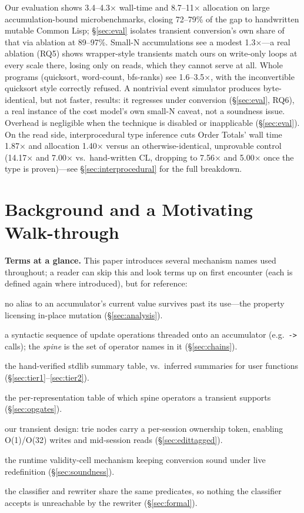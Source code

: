 \documentclass[sigplan,review,anonymous]{acmart}
\begin{document}
Our evaluation shows 3.4--4.3× wall-time and 8.7--11× allocation on large accumulation-bound microbenchmarks, closing 72--79\% of the gap to handwritten mutable Common Lisp; §\ref{sec:eval} isolates transient conversion's own share of that via ablation at 89--97\%. Small-N accumulations see a modest 1.3×---a real ablation (RQ5) shows wrapper-style transients match ours on write-only loops at every scale there, losing only on reads, which they cannot serve at all. Whole programs (quicksort, word-count, bfs-ranks) see 1.6--3.5×, with the inconvertible quicksort style correctly refused. A nontrivial event simulator produces byte-identical, but not faster, results: it regresses under conversion (§\ref{sec:eval}, RQ6), a real instance of the cost model's own small-N caveat, not a soundness issue. Overhead is negligible when the technique is disabled or inapplicable (§\ref{sec:eval}). On the read side, interprocedural type inference cuts Order Totals' wall time 1.87× and allocation 1.40× versus an otherwise-identical, unprovable control (14.17× and 7.00× vs.\ hand-written CL, dropping to 7.56× and 5.00× once the type is proven)---see §\ref{sec:interprocedural} for the full breakdown.

\section{Background and a Motivating Walk-through}
\label{sec:background}

\textbf{Terms at a glance.} This paper introduces several mechanism names used throughout; a reader can skip this and look terms up on first encounter (each is defined again where introduced), but for reference:
\begin{description}
    \setlength{\itemsep}{0pt}
    \item[\emph{uniqueness-at-death}] no alias to an accumulator's current value survives past its use---the property licensing in-place mutation (§\ref{sec:analysis}).
    \item[\emph{chain / spine}] a syntactic sequence of update operations threaded onto an accumulator (e.g.\ \texttt{->} calls); the \emph{spine} is the set of operator names in it (§\ref{sec:chains}).
    \item[\emph{Tier-1 / Tier-2}] the hand-verified stdlib summary table, vs.\ inferred summaries for user functions (§\ref{sec:tier1}--\ref{sec:tier2}).
    \item[\emph{op gate}] the per-representation table of which spine operators a transient supports (§\ref{sec:opgates}).
    \item[\emph{edit-tagged}] our transient design: trie nodes carry a per-session ownership token, enabling O(1)/O(32) writes and mid-session reads (§\ref{sec:edittagged}).
    \item[\emph{world guard}] the runtime validity-cell mechanism keeping conversion sound under live redefinition (§\ref{sec:soundness}).
    \item[\emph{alignment-by-construction}] the classifier and rewriter share the same predicates, so nothing the classifier accepts is unreachable by the rewriter (§\ref{sec:formal}).
\end{description}
\end{document}
